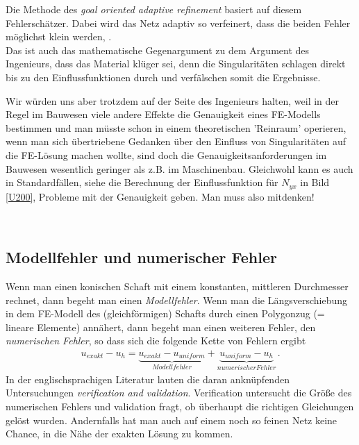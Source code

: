 {{{{Die Methode des {\em goal oriented adaptive refinement\/} basiert auf diesem Fehlersch\"{a}tzer. Dabei wird das Netz adaptiv so verfeinert, dass die beiden Fehler m\"{o}glichst klein werden, \cite{Ha5}.\\

Das ist auch das mathematische Gegenargument zu dem Argument des Ingenieurs, dass das Material kl\"{u}ger sei, denn die Singularit\"{a}ten schlagen direkt bis zu den Einflussfunktionen durch und verf\"{a}lschen somit die Ergebnisse.

Wir w\"{u}rden uns aber trotzdem auf der Seite des Ingenieurs halten, weil in der Regel im Bauwesen viele andere Effekte die Genauigkeit eines FE-Modells bestimmen und man m\"{u}sste schon in einem theoretischen 'Reinraum' operieren, wenn man sich \"{u}bertriebene Gedanken \"{u}ber den Einfluss von Singularit\"{a}ten auf die FE-L\"{o}sung machen wollte, sind doch die Genauigkeitsanforderungen im Bauwesen wesentlich geringer als z.B. im Maschinenbau. Gleichwohl kann es auch in Standardf\"{a}llen, siehe die Berechnung der Einflussfunktion f\"{u}r $N_{yx}$ in Bild \ref{U200}, Probleme mit der Genauigkeit geben. Man muss also mitdenken!

\\

{\textcolor{blau2}{\section{Modellfehler und numerischer Fehler}}}
Wenn man einen konischen Schaft mit einem konstanten, mittleren Durchmesser rechnet, dann begeht man einen {\em Modellfehler\/}. Wenn man die L\"{a}ngsverschiebung in dem FE-Modell des (gleichf\"{o}rmigen) Schafts durch einen Polygonzug (= lineare Elemente) ann\"{a}hert, dann begeht man einen weiteren Fehler, den {\em numerischen Fehler\/}, so dass sich die folgende Kette von Fehlern ergibt
\begin{align}
u_{exakt} - u_{h} = \underbrace{u_{exakt} - u_{uniform}}_{Modellfehler} +  \underbrace{ u_{uniform} - u_h}_{numerischer Fehler}\,.
\end{align}
In der englischsprachigen Literatur lauten die daran ankn\"{u}pfenden Untersuchungen {\em verification and validation\/}. Verification untersucht die Gr\"{o}{\ss}e des numerischen Fehlers und validation fragt, ob \"{u}berhaupt die richtigen Gleichungen gel\"{o}st wurden. Andernfalls hat man auch auf einem noch so feinen Netz keine Chance, in die N\"{a}he der exakten L\"{o}sung zu kommen.\\

}}}}
